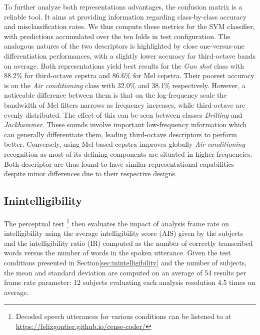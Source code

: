 \documentclass[sensors,article,submit,moreauthors,pdftex,10pt,a4paper]{mdpi}
\begin{document}
To further analyze both representations advantages, the confusion matrix is a reliable tool. It aims at providing information regarding class-by-class accuracy and misclassification rates. We thus compute these metrics for the SVM classifier, with predictions accumulated over the ten folds in test configuration. The analogous natures of the two descriptors is highlighted by close one-versus-one differentiation performances, with a slightly lower accuracy for third-octave bands on average. Both representations yield best results for the \textit{Gun shot} class with 88.2\% for third-octave cepstra and 86.6\% for Mel cepstra. Their poorest accuracy is on the \textit{Air conditioning} class with 32.0\% and 38.1\% respectively. However, a noticeable difference between them is that on the log-frequency scale the bandwidth of Mel filters narrows as frequency increases, while third-octave are evenly distributed. The effect of this can be seen between classes \textit{Drilling} and \textit{Jackhammer}. These sounds involve important low-frequency information which can generally differentiate them, leading third-octave descriptors to perform better. Conversely, using Mel-based cepstra improves globally \textit{Air conditioning} recognition as most of its defining components are situated in higher frequencies.\\

Both descriptor are thus found to have similar representational capabilities despite minor differences due to their respective designs.


\subsection{Inintelligibility}

The perceptual test \footnote{Decoded speech utterances for various conditions can be listened to at \url{https://felixgontier.github.io/cense-coder/}} then evaluates the impact of analysis frame rate on intelligibility using the average intelligibility score (AIS) given by the subjects and the intelligibility ratio (IR) computed as the number of correctly transcribed words versus the number of words in the spoken utterance. Given the test conditions presented in Section\ref{sec:inintelligibility} and the number of subjects, the mean and standard deviation are computed on an average of 54 results per frame rate parameter: 12 subjects evaluating each analysis resolution 4.5 times on average.
\end{document}
